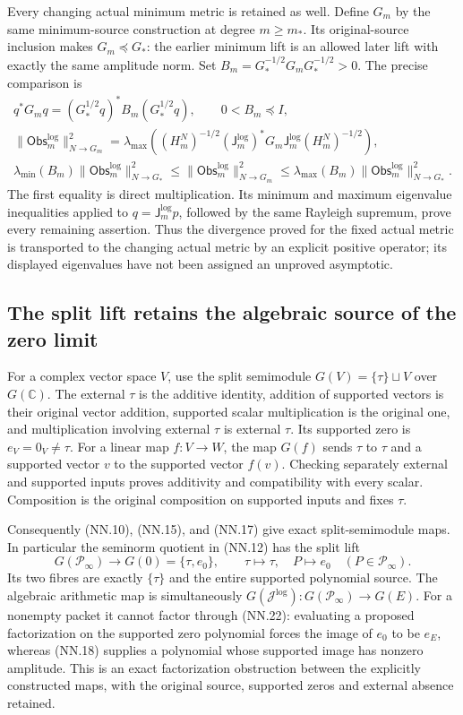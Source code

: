 Every changing actual minimum metric is retained as well. Define
\(G_m\) by the same minimum-source construction at degree \(m\ge m_*\).
Its original-source inclusion makes \(G_m\preceq G_*\): the earlier
minimum lift is an allowed later lift with exactly the same amplitude
norm. Set \(B_m=G_*^{-1/2}G_mG_*^{-1/2}>0\). The precise comparison is
\[
 \begin{gathered}
 q^*G_m q=(G_*^{1/2}q)^*B_m(G_*^{1/2}q),\qquad 0<B_m\preceq I,\\
 \|\mathsf{Obs}_m^{\log}\|_{N\to G_m}^2
  =\lambda_{\max}((H_m^N)^{-1/2}
       (\mathsf J_m^{\log})^*G_m\mathsf J_m^{\log}(H_m^N)^{-1/2}),\\
 \lambda_{\min}(B_m)\|\mathsf{Obs}_m^{\log}\|_{N\to G_*}^2
 \le\|\mathsf{Obs}_m^{\log}\|_{N\to G_m}^2
 \le\lambda_{\max}(B_m)\|\mathsf{Obs}_m^{\log}\|_{N\to G_*}^2.
 \end{gathered}
 \tag{NN.21}
\]
The first equality is direct multiplication. Its minimum and maximum
eigenvalue inequalities applied to \(q=\mathsf J_m^{\log}p\), followed
by the same Rayleigh supremum, prove every remaining assertion. Thus
the divergence proved for the fixed actual metric is transported to
the changing actual metric by an explicit positive operator; its
displayed eigenvalues have not been assigned an unproved asymptotic.

\subsection{The split lift retains the algebraic source of the zero limit}

For a complex vector space \(V\), use the split semimodule
\(G(V)=\{\tau\}\sqcup V\) over \(G(\mathbb C)\). The external
\(\tau\) is the additive identity, addition of supported vectors is
their original vector addition, supported scalar multiplication is
the original one, and multiplication involving external \(\tau\)
is external \(\tau\). Its supported zero is \(e_V=0_V\ne\tau\).
For a linear map \(f:V\to W\), the map \(G(f)\) sends \(\tau\)
to \(\tau\) and a supported vector \(v\) to the supported vector
\(f(v)\). Checking separately external and supported inputs proves
additivity and compatibility with every scalar. Composition is the
original composition on supported inputs and fixes \(\tau\).

Consequently (NN.10), (NN.15), and (NN.17) give exact split-semimodule
maps. In particular the seminorm quotient in (NN.12) has the split lift
\[
 G(\mathcal P_\infty)\longrightarrow G(0)=\{\tau,e_0\},\qquad
 \tau\longmapsto\tau,\quad P\longmapsto e_0
                          \quad(P\in\mathcal P_\infty).
 \tag{NN.22}
\]
Its two fibres are exactly \(\{\tau\}\) and the entire supported
polynomial source. The algebraic arithmetic map is simultaneously
\(G(\mathcal J^{\log}):G(\mathcal P_\infty)\to G(E)\).
For a nonempty packet it cannot factor through (NN.22): evaluating
a proposed factorization on the supported zero polynomial forces the
image of \(e_0\) to be \(e_E\), whereas (NN.18) supplies a polynomial
whose supported image has nonzero amplitude. This is an exact
factorization obstruction between the explicitly constructed maps,
with the original source, supported zeros and external absence retained.

